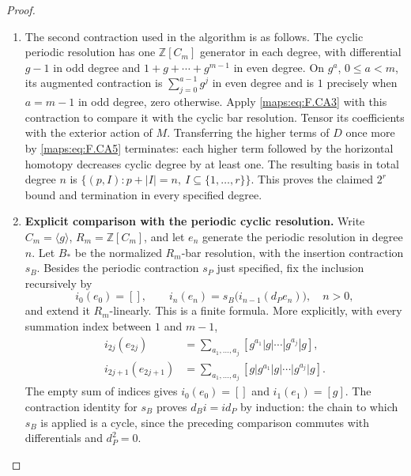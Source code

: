 \begin{proof}
\begin{enumerate}[label={$\langle1\rangle$\arabic*.}]
\item The second contraction used in the algorithm is as follows.  The cyclic periodic resolution has one
$\mathbb Z[C_m]$ generator in each degree, with differential
$g-1$ in odd degree and $1+g+\cdots+g^{m-1}$ in even degree.
On $g^a$, $0\leq a<m$, its augmented contraction is
$\sum_{j=0}^{a-1}g^j$ in even degree and is $1$ precisely when
$a=m-1$ in odd degree, zero otherwise.
Apply \eqref{maps:eq:F.CA3} with this contraction to compare it with the
cyclic bar resolution.  Tensor its coefficients with the
exterior action of $M$.  Transferring the higher terms of $D$
once more by \eqref{maps:eq:F.CA5} terminates: each higher term followed by
the horizontal homotopy decreases cyclic degree by at least
one.  The resulting basis in total degree $n$ is
$\{(p,I):p+|I|=n,\ I\subseteq\{1,\ldots,r\}\}$.
This proves the claimed $2^r$ bound and termination in every
specified degree.

\item \par\medskip\noindent\textbf{Explicit comparison with the periodic cyclic resolution.}\quad 
\hypertarget{tag-02J1}{}\label{maps:mapsF:repair:cyclic-inclusion}
Write $C_m=\langle g\rangle$, $R_m=\mathbb Z[C_m]$, and let
$e_n$ generate the periodic resolution in degree $n$.
Let $B_*$ be the normalized $R_m$-bar resolution, with the
insertion contraction $s_B$.  Besides the periodic contraction
$s_P$ just specified, fix the inclusion recursively by
\[
 i_0(e_0)=[],\qquad
 i_n(e_n)=s_B\bigl(i_{n-1}(d_Pe_n)\bigr),
 \quad n>0,
\]
and extend it $R_m$-linearly.  This is a finite formula.  More
explicitly, with every summation index between $1$ and $m-1$,
\[
\begin{split}
 i_{2j}(e_{2j})
   &=\sum_{a_1,\ldots,a_j}
       [g^{a_1}|g|\cdots|g^{a_j}|g],\\
 i_{2j+1}(e_{2j+1})
   &=\sum_{a_1,\ldots,a_j}
       [g|g^{a_1}|g|\cdots|g^{a_j}|g].
\end{split}
\]
The empty sum of indices gives $i_0(e_0)=[]$ and
$i_1(e_1)=[g]$.  The contraction identity for $s_B$ proves
$d_Bi=id_P$ by induction: the chain to which $s_B$ is applied
is a cycle, since the preceding comparison commutes with
differentials and $d_P^2=0$.


\end{enumerate}
\end{proof}
